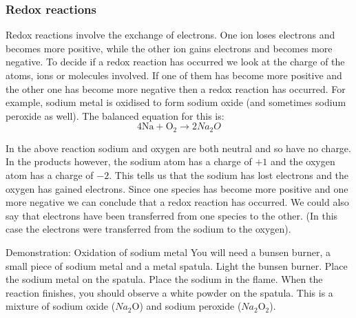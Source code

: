             \subsubsection{Redox reactions}
            \nopagebreak
            \label{m38719*eip-585}Redox reactions involve the exchange of electrons. One ion loses electrons and becomes more positive, while the other ion gains electrons and becomes more negative. To decide if a redox reaction has occurred we look at the charge of the atoms, ions or molecules involved. If one of them has become more positive and the other one has become more negative then a redox reaction has occurred. For example, sodium metal is oxidised to form sodium oxide (and sometimes sodium peroxide as well). The balanced equation for this is:
\label{m38719*id624}\nopagebreak\noindent{}
    \begin{equation}
    4\mathrm{Na}+{\mathrm{O}}_{2}\to 2{Na}_{2}{O}\tag{17.27}
      \end{equation}
\par \label{m38719*eip-815}In the above reaction sodium and oxygen are both neutral and so have no charge. In the products however, the sodium atom has a charge of $+1$ and the oxygen atom has a charge of $-2$. This tells us that the sodium has lost electrons and the oxygen has gained electrons. Since one species has become more positive and one more negative we can conclude that a redox reaction has occurred. We could also say that electrons have been transferred from one species to the other. (In this case the electrons were transferred from the sodium to the oxygen).\par \label{m38719*eip-878}
            \begin{g_experiment}{Demonstration: Oxidation of sodium metal}
            \nopagebreak
            \label{m38719*eip-355}
You will need a bunsen burner, a small piece of sodium metal and a metal spatula. Light the bunsen burner. Place the sodium metal on the spatula. Place the sodium in the flame. When the reaction finishes, you should observe a white powder on the spatula. This is a mixture of sodium oxide (${Na}_{2}\mathrm{O}$) and sodium peroxide (${Na}_{2}{\mathrm{O}}_{2}$). 
\par \label{m38719*eip-980}
\end{g_experiment}
	\par
\label{m38719*eip-611}
